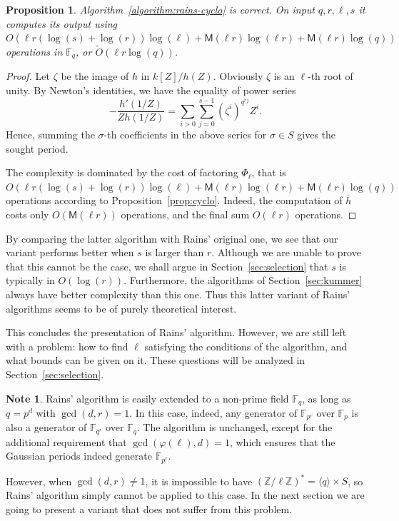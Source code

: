 \documentclass[12pt]{article}
\theoremstyle{plain}
\newtheorem{proposition}[theorem]{Proposition}
\theoremstyle{definition}
\newtheorem{note}[theorem]{Note}
\newcommand{\tildO}{\tilde{O}}
\def\Z{\ensuremath{\mathbb{Z}}}
\def\F{\ensuremath{\mathbb{F}}}
\def\MM{\ensuremath{\mathsf{M}}}
\def\euler{\ensuremath{\varphi}}
\newcounter{algorithm}
\begin{document}
\begin{proposition}
  Algorithm~\ref{algorithm:rains-cyclo} is correct. On input
  $q,r,\ell,s$ it computes its output using
  $O(\ell r(\log(s)+\log(r))\log(\ell) + \MM(\ell r)\log(\ell r) +
  \MM(\ell r)\log(q))$ operations in $\F_q$, or $\tildO(\ell r\log (q))$.
\end{proposition}
\begin{proof}
  Let $\zeta$ be the image of $h$ in $k[Z]/h(Z)$. Obviously $\zeta$ is
  an $\ell$-th root of unity. By Newton's identities, we have the
  equality of power series
  \begin{equation*}
    -\frac{h'(1/Z)}{Zh(1/Z)} = \sum_{i>0}\sum_{j=0}^{s-1}(\zeta^i)^{q^{rj}} Z^i.
  \end{equation*}
  Hence, summing the $\sigma$-th coefficients in the above series for
  $\sigma\in S$ gives the sought period.

  The complexity is dominated by the cost of factoring $\Phi_\ell$,
  that is
  $O(\ell r(\log(s)+\log(r))\log(\ell) + \MM(\ell r)\log(\ell r) +
  \MM(\ell r)\log(q))$ operations according to
  Proposition~\ref{prop:cyclo}. Indeed, the computation of $\bar{h}$
  costs only $O(\MM(\ell r))$ operations, and the final sum
  $O(\ell r)$ operations.
\end{proof}

By comparing the latter algorithm with Rains' original one, we see
that our variant performs better when $s$ is larger than $r$. Although
we are unable to prove that this cannot be the case, we shall argue in
Section~\ref{sec:selection} that $s$ is typically in
$O(\log(r))$. Furthermore, the algorithms of Section~\ref{sec:kummer}
always have better complexity than this one. Thus this latter variant
of Rains' algorithms seems to be of purely theoretical interest.

This concludes the presentation of Rains' algorithm. However, we are
still left with a problem: how to find $\ell$ satisfying the
conditions of the algorithm, and what bounds can be given on it. These
questions will be analyzed in Section~\ref{sec:selection}.

\begin{note}
  \label{note:rains-non-prime}
  Rains' algorithm is easily extended to a non-prime field $\F_q$, as
  long as $q=p^d$ with $\gcd(d,r)=1$. In this case, indeed, any
  generator of $\F_{p^r}$ over $\F_p$ is also a generator of
  $\F_{q^r}$ over $\F_q$. The algorithm is unchanged, except for the
  additional requirement that $\gcd(\euler(\ell),d)=1$, which ensures
  that the Gaussian periods indeed generate $\F_{p^r}$.

  However, when $\gcd(d,r)\ne 1$, it is impossible to have
  $(\Z/\ell\Z)^\ast=\langle q\rangle\times S$, so Rains' algorithm
  simply cannot be applied to this case. In the next section we are
  going to present a variant that does not suffer from this problem.
\end{note}
\end{document}
